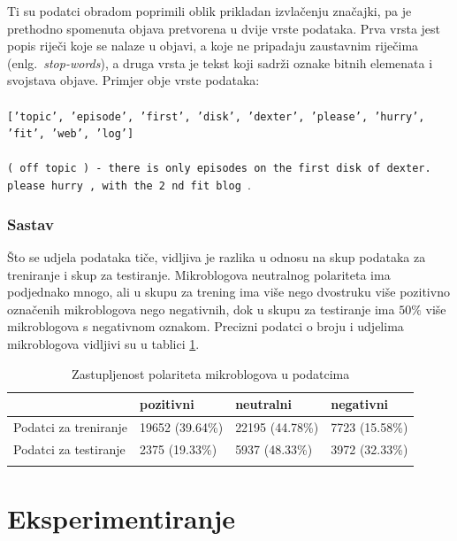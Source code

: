 \documentclass[times, utf8, zavrsni]{fer}
\begin{document}
\noindent Ti su podatci obradom poprimili oblik prikladan izvlačenju značajki, pa je prethodno spomenuta objava pretvorena u dvije vrste podataka. Prva vrsta jest popis riječi koje se nalaze u objavi, a koje ne pripadaju zaustavnim riječima (enlg.~\emph{stop-words}), a druga vrsta je tekst koji sadrži oznake bitnih elemenata i svojstava objave. Primjer obje vrste podataka:\\\\
\texttt{\footnotesize{['topic', 'episode', 'first', 'disk', 'dexter', 'please', 'hurry', \\'fit', 'web', 'log']}}\\\\
\footnotesize{\texttt{(  off topic  ) - there is only  episodes on the first disk of  dexter.\\ please hurry , with the 2 nd  fit blog }}.
\normalsize
\subsubsection{Sastav}
Što se udjela podataka tiče, vidljiva je razlika u odnosu na skup podataka za treniranje i skup za testiranje. Mikroblogova neutralnog polariteta ima podjednako mnogo, ali u skupu za trening ima više nego dvostruku više pozitivno označenih mikroblogova nego negativnih, dok u skupu za testiranje ima $50\%$ više mikroblogova s negativnom oznakom. Precizni podatci o broju i udjelima mikroblogova vidljivi su u tablici \ref{tablbroj}.

\begin{table}[h]
\centering
\begin{tabular}{|l|l|l|l|} 
\hline
                                      &pozitivni               &neutralni               &negativni            \\ 
\hline
Podatci za treniranje & 19652 (39.64\%) & 22195 (44.78\%) & 7723 (15.58\%) \\ 
\hline
Podatci za testiranje  & 2375 (19.33\%)   & 5937 (48.33\%)   & 3972 (32.33\%)  \\ 
\hline
\multicolumn{1}{l}{}  & \multicolumn{1}{l}{} & \multicolumn{1}{l}{} & \multicolumn{1}{l}{} 
\end{tabular}
\caption{Zastupljenost polariteta mikroblogova u podatcima}
\label{tablbroj}
\end{table}

\section{Eksperimentiranje}
\end{document}
